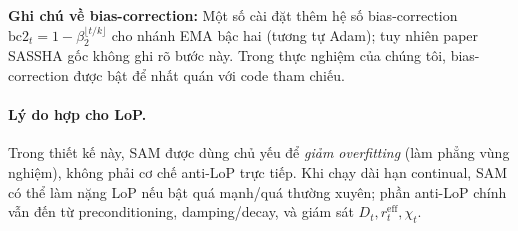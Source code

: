 \documentclass[11pt]{article}
\begin{document}
\noindent\textbf{Ghi chú về bias-correction:}
Một số cài đặt thêm hệ số bias-correction $\mathrm{bc2}_t=1-\beta_2^{\lfloor t/k\rfloor}$
cho nhánh EMA bậc hai (tương tự Adam); tuy nhiên paper SASSHA gốc không ghi rõ
bước này. Trong thực nghiệm của chúng tôi, bias-correction được bật để nhất quán với code tham chiếu.

\paragraph{Lý do hợp cho LoP.}
Trong thiết kế này, SAM được dùng chủ yếu để \emph{giảm overfitting} (làm phẳng vùng nghiệm), không phải cơ chế anti-LoP trực tiếp.
Khi chạy dài hạn continual, SAM có thể làm nặng LoP nếu bật quá mạnh/quá thường xuyên; phần anti-LoP chính vẫn đến từ preconditioning, damping/decay, và giám sát $D_t,r_t^{\mathrm{eff}},\chi_t$.
\end{document}
